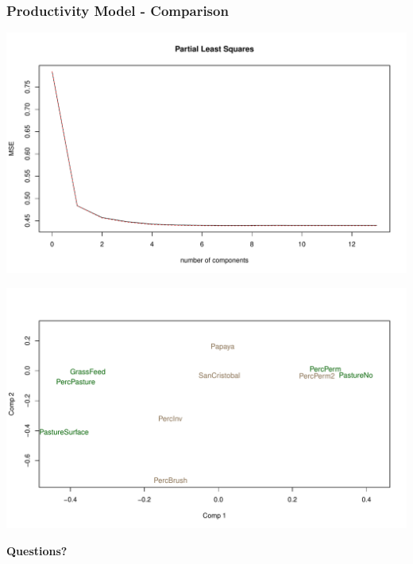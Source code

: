 \documentclass{beamer}
\begin{document}
\begin{frame}
\frametitle{Productivity Model - Comparison}
\centering
\includegraphics[scale=0.25]{plsplot1}

\includegraphics[scale=0.25]{plsplot2}

\end{frame}

\begin{frame}
\centering
{\huge \textbf{Questions?}}

\end{frame}
\end{document}
